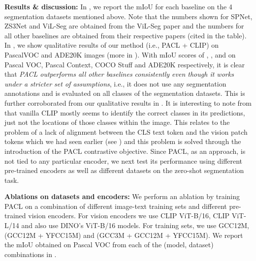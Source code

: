 \documentclass[10pt,twocolumn,letterpaper]{article}
\begin{document}
\textbf{Results \& discussion:} In , we report the mIoU for each baseline on the 4 segmentation datasets mentioned above. Note that the numbers shown for SPNet, ZS3Net and ViL-Seg are obtained from the ViL-Seg paper \cite{liu2022open} and the numbers for all other baselines are obtained from their respective papers (cited in the table). In , we show qualitative results of our method (i.e., PACL + CLIP) on PascalVOC and ADE20K images (more in ). With mIoU scores of , ,  and  on Pascal VOC, Pascal Context, COCO Stuff and ADE20K respectively, it is clear that \emph{PACL outperforms all other baselines consistently even though it works under a stricter set of assumptions}, i.e., it does not use any segmentation annotations and is evaluated on all classes of the segmentation datasets. This is further corroborated from our qualitative results in . It is interesting to note from  that vanilla CLIP mostly seems to identify the correct classes in its predictions, just not the locations of those classes within the image. This relates to the problem of a lack of alignment between the CLS text token and the vision patch tokens which we had seen earlier (see ) and this problem is solved through the introduction of the PACL contrastive objective. Since PACL, as an approach, is not tied to any particular encoder, we next test its performance using different pre-trained encoders as well as different datasets on the zero-shot segmentation task.

\textbf{Ablations on datasets and encoders:} We perform an ablation by training PACL on a combination of different image-text training sets and different pre-trained vision encoders. For vision encoders we use CLIP ViT-B/16, CLIP ViT-L/14 and also use DINO's \cite{caron2021emerging} ViT-B/16 models. For training sets, we use GCC12M, (GCC12M + YFCC15M) and (GCC3M + GCC12M + YFCC15M). We report the mIoU obtained on Pascal VOC from each of the (model, dataset) combinations in .
\end{document}
